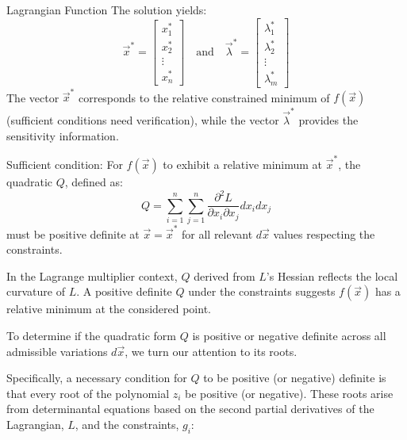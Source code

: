 \documentclass[
    NAME={Dr. Helga Ingimundardóttir},
    EMAIL={helgaingim@hi.is},
    FACULTY={Industrial Engineering},
    TITLE={Nonlinear Optimization},
    SUBTITLE={Approaches and Challenges},
    SEMINAR={VÉL113F},
    DATE={Design and Optimization}
]{../HI-latex/hi-beamer}
\begin{document}
\begin{frame}{Lagrangian Function}
        The solution yields:
        \[
            \vec{x}^* = \begin{bmatrix}
                                    x_1^*  \\
                                    x_2^*  \\
                                    \vdots \\
                                    x_n^*
            \end{bmatrix}
            \quad \text{and} \quad
            \vec{\lambda}^* = \begin{bmatrix}
                                          \lambda_1^* \\
                                          \lambda_2^* \\
                                          \vdots      \\
                                          \lambda_m^*
            \end{bmatrix}
        \]
        The vector \(\vec{x}^*\) corresponds to the relative constrained minimum of \(f(\vec{x})\) (sufficient
        conditions need verification), while the vector \(\vec{\lambda}^*\) provides the sensitivity information.

        \framebreak

        \alert{Sufficient condition}: For \(f(\vec{x})\) to exhibit a relative minimum at \(\vec{x}^*\), the
        quadratic $Q$, defined as:
        \[ Q = \sum_{i=1}^n \sum_{j=1}^n \frac{\partial^2 L}{\partial x_i\partial x_j}dx_i dx_j \]
        must be positive definite at \(\vec{x} = \vec{x}^*\) for all relevant  \(d\vec{x}\) values respecting the
        constraints.

        \bigskip

        In the Lagrange multiplier context, $Q$ derived from $L$'s Hessian reflects the local curvature of $L$.
        A positive definite $Q$ under the constraints suggests $f(\vec{x})$ has a relative minimum at the
        considered point.

        \framebreak

        To determine if the quadratic form \(Q\) is positive or negative definite across all admissible variations
        $d\vec{x}$, we turn our attention to its roots.

        Specifically, a \alert{necessary condition} for $Q$ to be
        positive (or negative) definite is that every root of the polynomial $z_i$ be positive (or negative).
        These roots arise from determinantal equations based on the second partial derivatives of the Lagrangian, $L$,
        and the constraints, $g_i$:


\end{frame}
\end{document}
